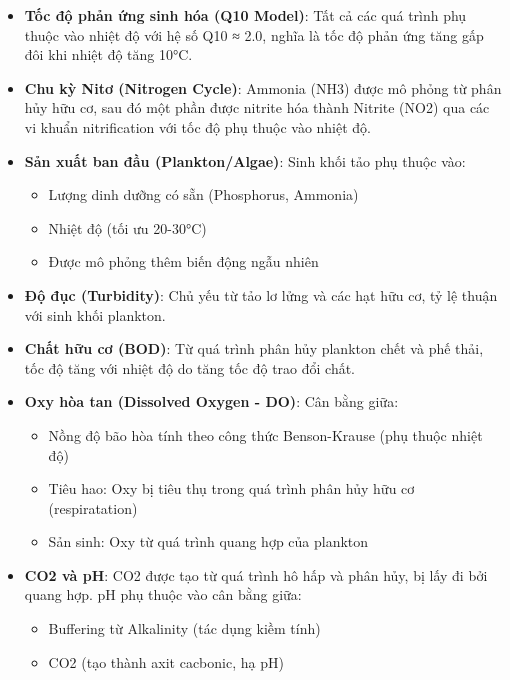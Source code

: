 \begin{itemize}
    \item \textbf{Tốc độ phản ứng sinh hóa (Q10 Model)}: Tất cả các quá trình phụ thuộc vào nhiệt độ với hệ số Q10 ≈ 2.0, nghĩa là tốc độ phản ứng tăng gấp đôi khi nhiệt độ tăng 10°C.
    
    \item \textbf{Chu kỳ Nitơ (Nitrogen Cycle)}: Ammonia (NH3) được mô phỏng từ phân hủy hữu cơ, sau đó một phần được nitrite hóa thành Nitrite (NO2) qua các vi khuẩn nitrification với tốc độ phụ thuộc vào nhiệt độ.
    
    \item \textbf{Sản xuất ban đầu (Plankton/Algae)}: Sinh khối tảo phụ thuộc vào:
    \begin{itemize}
        \item Lượng dinh dưỡng có sẵn (Phosphorus, Ammonia)
        \item Nhiệt độ (tối ưu 20-30°C)
        \item Được mô phỏng thêm biến động ngẫu nhiên
    \end{itemize}
    
    \item \textbf{Độ đục (Turbidity)}: Chủ yếu từ tảo lơ lửng và các hạt hữu cơ, tỷ lệ thuận với sinh khối plankton.
    
    \item \textbf{Chất hữu cơ (BOD)}: Từ quá trình phân hủy plankton chết và phế thải, tốc độ tăng với nhiệt độ do tăng tốc độ trao đổi chất.
    
    \item \textbf{Oxy hòa tan (Dissolved Oxygen - DO)}: Cân bằng giữa:
    \begin{itemize}
        \item Nồng độ bão hòa tính theo công thức Benson-Krause (phụ thuộc nhiệt độ)
        \item Tiêu hao: Oxy bị tiêu thụ trong quá trình phân hủy hữu cơ (respiratation)
        \item Sản sinh: Oxy từ quá trình quang hợp của plankton
    \end{itemize}
    
    \item \textbf{CO2 và pH}: CO2 được tạo từ quá trình hô hấp và phân hủy, bị lấy đi bởi quang hợp. pH phụ thuộc vào cân bằng giữa:
    \begin{itemize}
        \item Buffering từ Alkalinity (tác dụng kiềm tính)
        \item CO2 (tạo thành axit cacbonic, hạ pH)
    \end{itemize}
    

\end{itemize}
